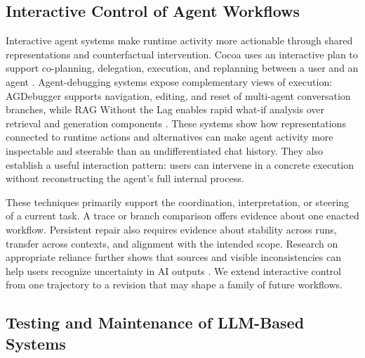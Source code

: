 \subsection{Interactive Control of Agent Workflows}
\label{sec:rw-interactive-control}

Interactive agent systems make runtime activity more actionable through shared
representations and counterfactual intervention. Cocoa uses an interactive plan
to support co-planning, delegation, execution, and replanning between a user and
an agent \cite{feng2026cocoa}. Agent-debugging systems expose complementary
views of execution: AGDebugger supports navigation, editing, and reset of
multi-agent conversation branches, while RAG Without the Lag enables rapid
what-if analysis over retrieval and generation components
\cite{epperson2025agdebugger,romerolauro2026rag}. These systems show how
representations connected to runtime actions and alternatives can make agent
activity more inspectable and steerable than an undifferentiated chat history.
They also establish a useful interaction pattern: users can intervene in a
concrete execution without reconstructing the agent's full internal process.

These techniques primarily support the coordination, interpretation, or
steering of a current task. A trace or branch comparison offers evidence about
one enacted workflow. Persistent repair also requires evidence about stability
across runs, transfer across contexts, and alignment with the intended scope.
Research on appropriate reliance further shows that sources and visible
inconsistencies can help users recognize uncertainty in AI outputs
\cite{kim2025reliance}. We extend interactive control from one trajectory to a
revision that may shape a family of future workflows.

\subsection{Testing and Maintenance of LLM-Based Systems}
\label{sec:rw-maintenance}

